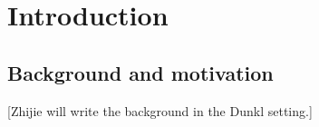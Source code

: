 \documentclass[12pt]{amsart}
\begin{document}
\author{Dmitriy Zanin}
\address{Dmitriy Zanin, University of New South Wales, Kensington, NSW 2052, Australia}






  \date{\today}





\begin{abstract}

\end{abstract}

\maketitle


\tableofcontents

\section{Introduction}
\subsection{Background and motivation}
{\color{red}[Zhijie will write the background in the Dunkl setting.]}
\end{document}
